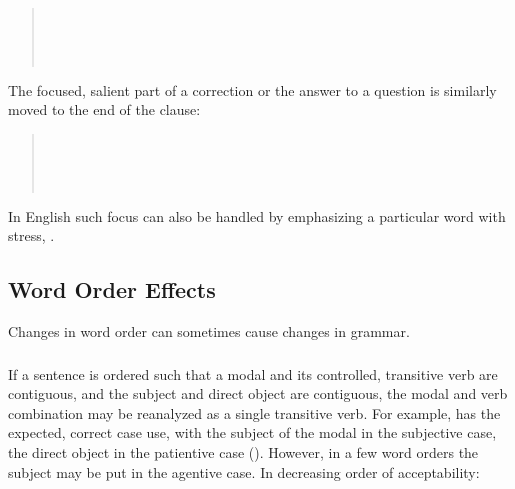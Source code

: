 \begin{quotation}
\noindent{}\\
\indent{}\\

\noindent{}\\
\indent{}
\end{quotation}

\noindent The focused, salient part of a correction or the answer to a
question is similarly moved to the end of the clause:

\begin{quotation}
\noindent{}\\
\indent{}\\

\noindent{}\\
\indent{}
\end{quotation}

\noindent In English such focus can also be handled by emphasizing a
particular word with stress, .



\subsection{Word Order Effects}  Changes in
word order can sometimes cause changes in grammar. \label{pragma:woe}

\subsubsection{} \label{pragma:word-order-effects:modals} If a
sentence is ordered such that a modal and its controlled, transitive
verb are con\-tiguous, and the subject and direct object are contiguous,
the modal and verb combination may be reanalyzed as a single
transitive verb.  For example,   has the expected, correct case use, with the subject
of the modal in the subjective case, the direct object in the
patientive case ().  However, in a few word
orders the subject may be put in the agentive case.  In decreasing
order of acceptability:

